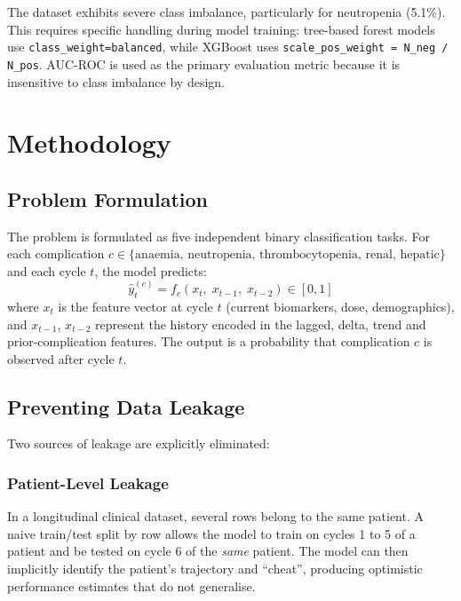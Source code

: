 \documentclass[12pt,a4paper]{report}
\begin{document}
The dataset exhibits severe class imbalance, particularly for neutropenia (5.1\%). This requires specific handling during model training: tree-based forest models use \texttt{class\_weight=\textquotesingle{}balanced\textquotesingle{}}, while XGBoost uses \texttt{scale\_pos\_weight = N\_neg / N\_pos}. AUC-ROC is used as the primary evaluation metric because it is insensitive to class imbalance by design.

\chapter{Methodology}
\label{chap:methodology}

\section{Problem Formulation}

The problem is formulated as five independent binary classification tasks. For each complication $c \in \{\text{anaemia, neutropenia, thrombocytopenia, renal, hepatic}\}$ and each cycle $t$, the model predicts:
\[
\hat{y}_t^{(c)} = f_c\!\left(x_t,\; x_{t-1},\; x_{t-2}\right) \in [0, 1]
\]
where $x_t$ is the feature vector at cycle $t$ (current biomarkers, dose, demographics), and $x_{t-1}$, $x_{t-2}$ represent the history encoded in the lagged, delta, trend and prior-complication features. The output is a probability that complication $c$ is observed after cycle $t$.

\section{Preventing Data Leakage}
\label{sec:leakage}

Two sources of leakage are explicitly eliminated:

\subsection{Patient-Level Leakage}

In a longitudinal clinical dataset, several rows belong to the same patient. A naive train/test split by row allows the model to train on cycles 1 to 5 of a patient and be tested on cycle 6 of the \emph{same} patient. The model can then implicitly identify the patient's trajectory and ``cheat'', producing optimistic performance estimates that do not generalise.
\end{document}
